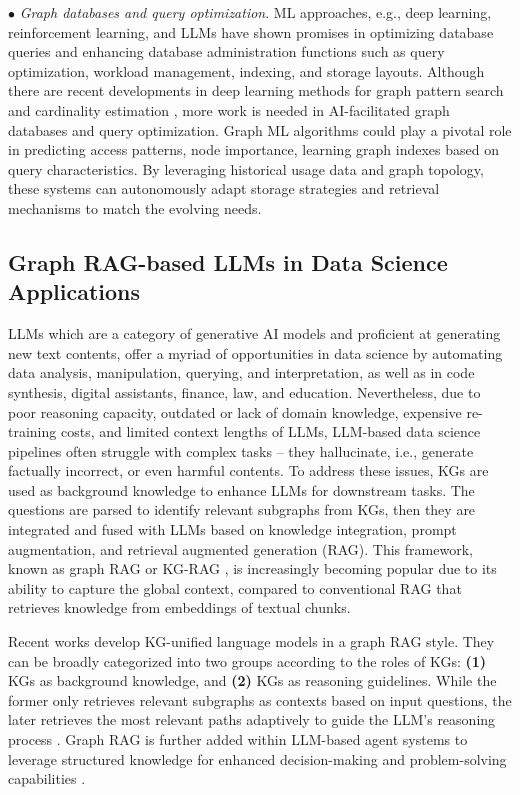 \documentclass{sig-alternate-10pt}
\begin{document}
\noindent $\bullet$ {\em Graph databases and query optimization}.
ML approaches, e.g., deep learning, reinforcement learning, and LLMs have shown promises in optimizing database queries and enhancing database administration functions such as query optimization, workload management, indexing, and storage layouts. Although there are recent developments in deep learning methods for graph pattern search and cardinality estimation \cite{ZYZLR21},
more work is needed in AI-facilitated graph databases and query optimization.
Graph ML algorithms could play a pivotal role in predicting access patterns, node importance, learning graph indexes based on query characteristics. By leveraging historical usage data and graph topology, these systems can autonomously adapt storage strategies and retrieval
mechanisms to match the evolving needs.


\subsection{Graph RAG-based LLMs in Data Science Applications}
\label{sec:graphrag}

\medskip
\medskip

LLMs which are a category of generative AI models and proficient at generating new text contents, offer a myriad of opportunities in data science by automating data analysis, manipulation, querying, and interpretation, as well as in code synthesis, digital assistants, finance, law, and education. Nevertheless, due to poor reasoning capacity, outdated or lack of domain knowledge, expensive re-training costs, and limited context lengths of LLMs, LLM-based data science pipelines often struggle with complex tasks -- they hallucinate, i.e., generate factually incorrect, or even harmful contents. To address these issues, KGs are used as background knowledge to enhance LLMs for downstream tasks. The questions are parsed to identify relevant subgraphs from KGs, then they are integrated and fused with LLMs based on knowledge integration, prompt augmentation, and retrieval augmented generation (RAG). This framework, known as graph RAG or KG-RAG \cite{XuCGWDWL24}, is increasingly becoming popular due to its ability
to capture the global context, compared to conventional RAG that retrieves knowledge from embeddings of textual chunks.


Recent works \cite{mavromatis2024gnnraggraphneuralretrieval,he2024g,WLRSZD24,WHBQRXS23} develop
KG-unified language models in a graph RAG style.
They can be broadly categorized into two groups according to the roles of KGs: {\bf (1)} KGs as background knowledge, and {\bf (2)} KGs as reasoning
guidelines. While the former only retrieves relevant subgraphs as contexts based on input questions, the later retrieves the most relevant paths adaptively to guide the LLM’s reasoning process \cite{SXTWLGSG24}. Graph RAG is further added within LLM-based agent systems to leverage structured knowledge for enhanced decision-making and problem-solving capabilities \cite{SunTLA24}.
\end{document}
